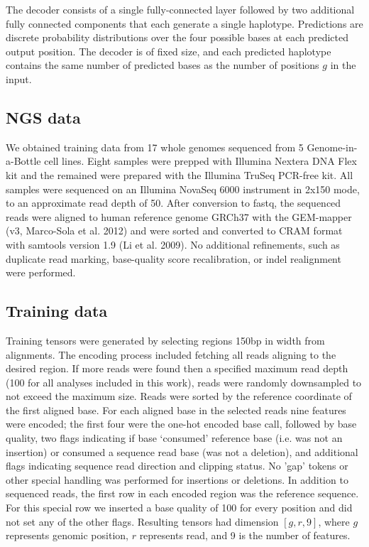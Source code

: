 \documentclass[]{article}
\begin{document}
The decoder consists of a single fully-connected layer followed by two additional fully connected components that each generate a single haplotype. Predictions are discrete probability distributions over the four possible bases at each predicted output position. The decoder is of fixed size, and each predicted haplotype contains the same number of predicted bases as the number of positions $g$ in the input. 


\subsection{NGS data}

We obtained training data from 17 whole genomes sequenced from 5 Genome-in-a-Bottle cell lines. Eight samples were prepped with Illumina Nextera DNA Flex kit and the remained were prepared with the Illumina TruSeq PCR-free kit. All samples were sequenced on an Illumina NovaSeq 6000 instrument in 2x150 mode, to an approximate read depth of 50. After conversion to fastq, the sequenced reads were aligned to human reference genome GRCh37 with the GEM-mapper (v3, Marco-Sola et al. 2012) and were sorted and converted to CRAM format with samtools version 1.9 (Li et al. 2009). No additional refinements, such as duplicate read marking, base-quality score recalibration, or indel realignment were performed.

\subsection{Training data}

Training tensors were generated by selecting regions 150bp in width from alignments. The encoding process included fetching all reads aligning to the desired region. If more reads were found then a specified maximum read depth (100 for all analyses included in this work), reads were randomly downsampled to not exceed the maximum size. Reads were sorted by the reference coordinate of the first aligned base. For each aligned base in the selected reads nine features were encoded; the first four were the one-hot encoded base call, followed by base quality, two flags indicating if base `consumed' reference base (i.e. was not an insertion) or consumed a sequence read base (was not a deletion), and additional flags indicating sequence read direction and clipping status.  No 'gap' tokens or other special handling was performed for insertions or deletions. In addition to sequenced reads, the first row in each encoded region was the reference sequence. For this special row we inserted a base quality of 100 for every position and did not set any of the other flags. Resulting tensors had dimension $[g, r, 9]$, where $g$ represents genomic position, $r$ represents read, and 9 is the number of features. 
\end{document}
